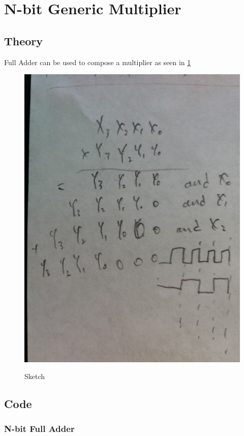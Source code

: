 \documentclass{article}
\begin{document}
\newpage

\section{N-bit Generic Multiplier}
\subsection{Theory}
Full Adder can be used to compose a multiplier as seen in \ref{fig:5_0}
\begin{figure}[H]
  \centering
  \caption{Sketch}
  \includegraphics[width=\textwidth]{ECE4304_Midterm1_5_Sketch.jpg}
  \label{fig:5_0}
\end{figure}
\subsection*{Code}
\subsubsection*{N-bit Full Adder}

\;\\
\end{document}
